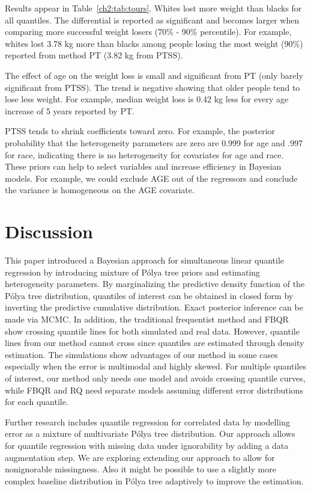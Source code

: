 \documentclass[12pt]{article}
\newcommand{\polya}{P\'{o}lya}
\begin{document}
Results appear in Table~\ref{ch2:tab:tours}.
Whites lost more weight than blacks for all quantiles.
The differential is reported as significant and becomes larger when comparing more successful weight losers (70\% - 90\% percentile).
For example, whites lost 3.78 kg more than blacks among people losing the most weight (90\%) reported from method PT (3.82 kg from PTSS).

The effect of age on the weight loss is small and significant from PT (only barely significant from PTSS).
The trend is negative showing that older people tend to lose less weight.
For example, median weight loss is 0.42 kg less for every age increase of 5 years reported by PT.

PTSS tends to shrink coefficients toward zero. For example, the
posterior probability that the heterogeneity parameters are zero are
0.999 for age and .997 for race, indicating there is no
heterogeneity for covariates for age and race. These priors can help to select
variables and increase efficiency in Bayesian models. For example, we
could exclude AGE out of the regressors and conclude the variance is
homogeneous on the AGE covariate.


\section{Discussion}
\label{ch2:sec:discussion}
This paper introduced a Bayesian approach for simultaneous linear quantile regression by introducing mixture of \polya{} tree priors and estimating heterogeneity parameters.
By marginalizing the predictive density function of the \polya{} tree distribution, quantiles of interest can be obtained in closed form by inverting the predictive cumulative distribution.
Exact posterior inference can be made via MCMC.
In addition, the traditional frequentist method and FBQR show crossing quantile lines for both simulated and real data.
However, quantile lines from our method cannot cross since quantiles are estimated through density estimation.
The simulations show advantages of our method in some cases especially when the error is multimodal and highly skewed.
For multiple quantiles of interest, our method only needs one model and avoids crossing quantile curves, while FBQR and RQ need separate models assuming different error distributions for each quantile.

Further research includes quantile regression for correlated data by modelling error as a mixture of multivariate \polya{} tree distribution.
Our approach allows for quantile regression with missing data under ignorability by adding a data augmentation step.
We are exploring extending our approach to allow for nonignorable missingness.
Also it might be possible to use a slightly more complex baseline distribution in \polya{} tree adaptively to improve the estimation.

 
\end{document}
